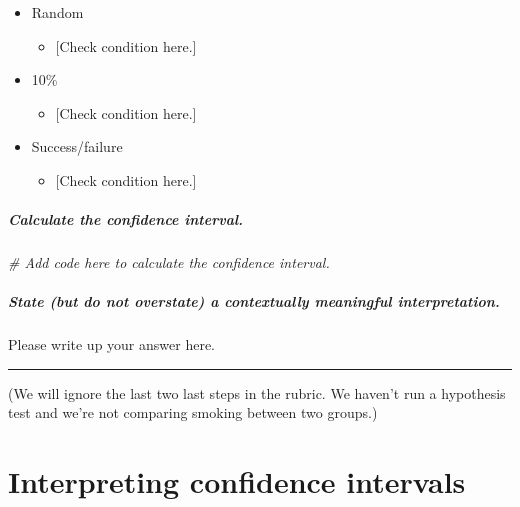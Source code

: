 \documentclass[
]{book}
\newenvironment{Shaded}{\begin{snugshade}}{\end{snugshade}}
\newcommand{\CommentTok}[1]{\textcolor[rgb]{0.56,0.35,0.01}{\textit{#1}}}
\providecommand{\tightlist}{%
  \setlength{\itemsep}{0pt}\setlength{\parskip}{0pt}}
\begin{document}
\begin{itemize}
\tightlist
\item
  Random

  \begin{itemize}
  \tightlist
  \item
    {[}Check condition here.{]}
  \end{itemize}
\item
  10\%

  \begin{itemize}
  \tightlist
  \item
    {[}Check condition here.{]}
  \end{itemize}
\item
  Success/failure

  \begin{itemize}
  \tightlist
  \item
    {[}Check condition here.{]}
  \end{itemize}
\end{itemize}

\hypertarget{calculate-the-confidence-interval.}{%
\subparagraph*{Calculate the confidence interval.}\label{calculate-the-confidence-interval.}}

\begin{Shaded}
\begin{Highlighting}[]
\CommentTok{\# Add code here to calculate the confidence interval.}
\end{Highlighting}
\end{Shaded}

\hypertarget{state-but-do-not-overstate-a-contextually-meaningful-interpretation.}{%
\subparagraph*{State (but do not overstate) a contextually meaningful interpretation.}\label{state-but-do-not-overstate-a-contextually-meaningful-interpretation.}}

Please write up your answer here.

\begin{center}\rule{0.5\linewidth}{0.5pt}\end{center}

(We will ignore the last two last steps in the rubric. We haven't run a hypothesis test and we're not comparing smoking between two groups.)

\hypertarget{ci-interpret}{%
\section{Interpreting confidence intervals}\label{ci-interpret}}
\end{document}
